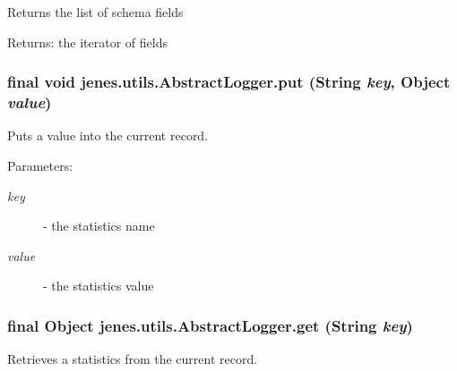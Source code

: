 Returns the list of schema fields

\begin{Desc}
\item[Returns:]the iterator of fields \end{Desc}
\hypertarget{classjenes_1_1utils_1_1_abstract_logger_0f00b8fa60e88b7c2834be7cdf1fc07e}{
\subsubsection[put]{\setlength{\rightskip}{0pt plus 5cm}final void jenes.utils.AbstractLogger.put (String {\em key}, \/  Object {\em value})}}
\label{classjenes_1_1utils_1_1_abstract_logger_0f00b8fa60e88b7c2834be7cdf1fc07e}


Puts a value into the current record.

\begin{Desc}
\item[Parameters:]
\begin{description}
\item[{\em key}]- the statistics name \item[{\em value}]- the statistics value \end{description}
\end{Desc}
\hypertarget{classjenes_1_1utils_1_1_abstract_logger_cceb0a183912b0ec7fc95554ab2e3001}{
\subsubsection[get]{\setlength{\rightskip}{0pt plus 5cm}final Object jenes.utils.AbstractLogger.get (String {\em key})}}
\label{classjenes_1_1utils_1_1_abstract_logger_cceb0a183912b0ec7fc95554ab2e3001}


Retrieves a statistics from the current record.

